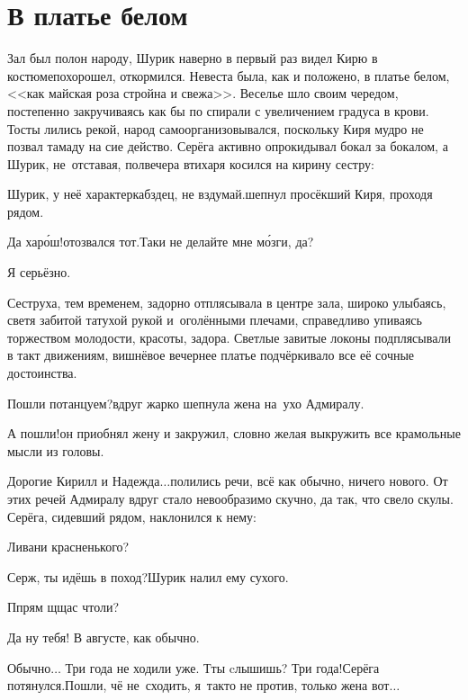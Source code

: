 {
\chapter{В платье белом}
\vepsianrose

\fancyhead[LE]{\fancyplain{}{\bfseries \parttitle}}
\fancyhead[RO]{\fancyplain{}{\bfseries \rightmark}}

Зал был полон народу, Шурик наверно в первый раз видел Кирю в костюме\mdash похорошел, откормился. Невеста была, как и положено, в платье белом, <<как майская роза стройна и свежа>>. Веселье шло своим чередом, постепенно закручиваясь как бы по спирали с увеличением градуса в крови. Тосты лились рекой, народ самоорганизовывался, поскольку Киря мудро не позвал тамаду на сие действо. Серёга активно опрокидывал бокал за бокалом, а Шурик, не~отставая, полвечера втихаря косился на кирину сестру:

\diagdash Шурик, у неё характер\mdash кабздец, не вздумай.\mdash шепнул просёкший Киря, проходя рядом. 

\diagdash Да хар\'{о}ш!\mdash отозвался тот.\mdash Таки не делайте мне м\'{о}зги, да?

\diagdash Я серьёзно.

Сеструха, тем временем, задорно отплясывала в центре зала, широко улыбаясь, светя забитой татухой рукой и~оголёнными плечами, справедливо упиваясь торжеством молодости, красоты, задора. Светлые завитые локоны подплясывали в такт движениям, вишнёвое вечернее платье подчёркивало все её сочные достоинства.

\diagdash Пошли потанцуем?\mdash вдруг жарко шепнула жена на~ухо Адмиралу.

\diagdash А пошли!\mdash он приобнял жену и закружил, словно желая выкружить все крамольные мысли из головы. 

\diagdash Дорогие Кирилл и Надежда$\ldots$\mdash полились речи, всё как обычно, ничего нового. От этих речей Адмиралу вдруг стало невообразимо скучно, да так, что свело скулы. Серёга, сидевший рядом, наклонился к нему:

\diagdash Ливани красненького?

\diagdash Серж, ты идёшь в поход?\mdash Шурик налил ему сухого. 

\diagdash П\sdash прям щ\sdash щас чтоли?

\diagdash Да ну тебя! В августе, как обычно.

\diagdash Обычно$\ldots$ Три года не ходили уже. Т\sdash ты cлышишь? Три года!\mdash Серёга потянулся.\mdash Пошли, чё не~сходить, я~так\sdash то не против, только жена вот$\ldots$

}
